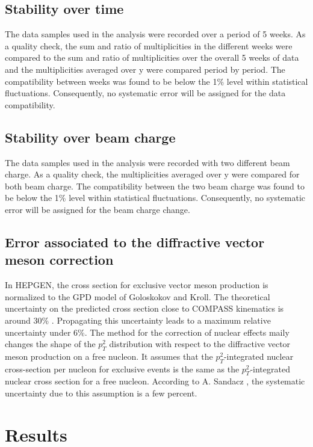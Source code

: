 \documentclass[letterpaper,12pt]{article}
\begin{document}
\subsection{Stability over time}

The data samples used in the analysis were recorded over a period of 5 weeks. As a quality check, the sum and ratio of multiplicities in the different weeks were compared to the sum and ratio of multiplicities over the overall 5 weeks of data and the multiplicities averaged over y were compared period by period. The compatibility between weeks was found to be below the 1\% level within statistical fluctuations. Consequently, no systematic error will be assigned for the data compatibility.

\subsection{Stability over beam charge}

The data samples used in the analysis were recorded with two different beam charge. As a quality check, the multiplicities averaged over y were compared for both beam charge. The compatibility between the two beam charge was found to be below the 1\% level within statistical fluctuations. Consequently, no systematic error will be assigned for the beam charge change.

\subsection{Error associated to the diffractive vector meson correction}

In HEPGEN, the cross section for exclusive vector meson production is normalized to the GPD model of Goloskokov and Kroll. The theoretical uncertainty on the predicted cross section close to COMPASS kinematics is around 30\% \cite{}. Propagating this uncertainty leads to a maximum relative uncertainty under 6\%.
The method for the correction of nuclear effects maily changes the shape of the $p_T^2$ distribution with respect to the diffractive vector meson production on a free nucleon. It assumes that the $p_T^2$-integrated nuclear cross-section per nucleon for exclusive events is the same as the $p_T^2$-integrated nuclear cross section for a free nucleon. According to A. Sandacz \cite{}, the systematic uncertainty due to this assumption is a few percent.

\section{Results} \label{Res}
\end{document}
